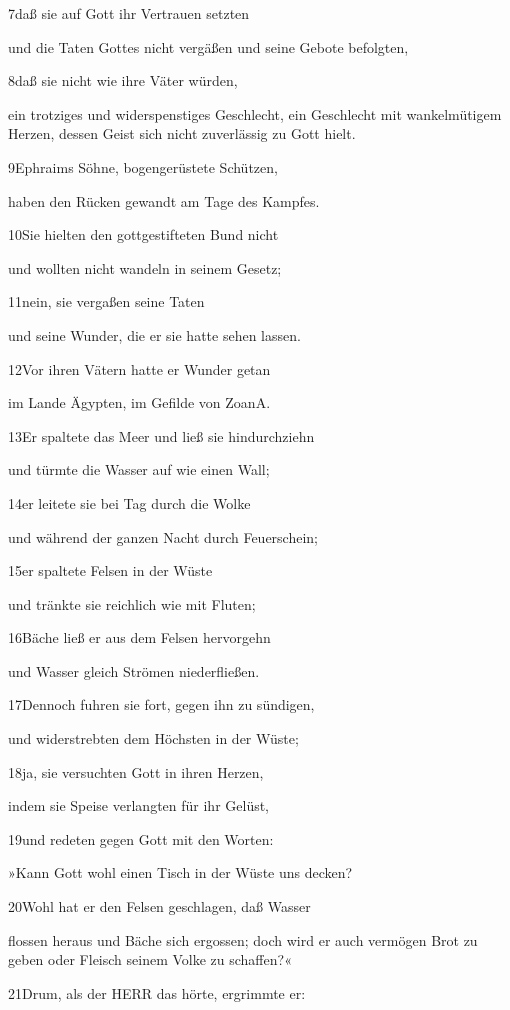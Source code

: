 7daß sie auf Gott ihr Vertrauen setzten

und die Taten Gottes nicht vergäßen und seine Gebote befolgten,

8daß sie nicht wie ihre Väter würden,

ein trotziges und widerspenstiges Geschlecht, ein Geschlecht mit
wankelmütigem Herzen, dessen Geist sich nicht zuverlässig zu Gott hielt.

9Ephraims Söhne, bogengerüstete Schützen,

haben den Rücken gewandt am Tage des Kampfes.

10Sie hielten den gottgestifteten Bund nicht

und wollten nicht wandeln in seinem Gesetz;

11nein, sie vergaßen seine Taten

und seine Wunder, die er sie hatte sehen lassen.

12Vor ihren Vätern hatte er Wunder getan

im Lande Ägypten, im Gefilde von Zoan{A}.

13Er spaltete das Meer und ließ sie hindurchziehn

und türmte die Wasser auf wie einen Wall;

14er leitete sie bei Tag durch die Wolke

und während der ganzen Nacht durch Feuerschein;

15er spaltete Felsen in der Wüste

und tränkte sie reichlich wie mit Fluten;

16Bäche ließ er aus dem Felsen hervorgehn

und Wasser gleich Strömen niederfließen.

17Dennoch fuhren sie fort, gegen ihn zu sündigen,

und widerstrebten dem Höchsten in der Wüste;

18ja, sie versuchten Gott in ihren Herzen,

indem sie Speise verlangten für ihr Gelüst,

19und redeten gegen Gott mit den Worten:

»Kann Gott wohl einen Tisch in der Wüste uns decken?

20Wohl hat er den Felsen geschlagen, daß Wasser

flossen heraus und Bäche sich ergossen; doch wird er auch vermögen Brot
zu geben oder Fleisch seinem Volke zu schaffen?«

21Drum, als der HERR das hörte, ergrimmte er:

